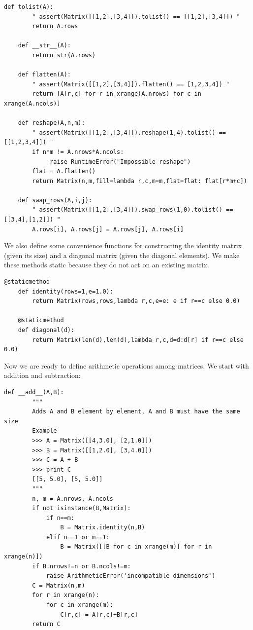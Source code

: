 \documentclass[justified,sixbynine]{tufte-book}
\def\ft{\small\tt}
\theoremstyle{plain}%
\theoremstyle{definition}
\theoremstyle{remark}
\begin{document}
\begin{fullwidth}
\begin{lstlisting}[caption={in file: {\ft nlib.py}}]
    def tolist(A):
        " assert(Matrix([[1,2],[3,4]]).tolist() == [[1,2],[3,4]]) "
        return A.rows

    def __str__(A):
        return str(A.rows)

    def flatten(A):
        " assert(Matrix([[1,2],[3,4]]).flatten() == [1,2,3,4]) "
        return [A[r,c] for r in xrange(A.nrows) for c in xrange(A.ncols)]

    def reshape(A,n,m):
        " assert(Matrix([[1,2],[3,4]]).reshape(1,4).tolist() == [[1,2,3,4]]) "
        if n*m != A.nrows*A.ncols:
             raise RuntimeError("Impossible reshape")
        flat = A.flatten()
        return Matrix(n,m,fill=lambda r,c,m=m,flat=flat: flat[r*m+c])

    def swap_rows(A,i,j):
        " assert(Matrix([[1,2],[3,4]]).swap_rows(1,0).tolist() == [[3,4],[1,2]]) "
        A.rows[i], A.rows[j] = A.rows[j], A.rows[i]
\end{lstlisting}


We also define some convenience functions for constructing the identity matrix (given its size) and a diagonal matrix (given the diagonal elements). We make these methods static because they do not act on an existing matrix.

\begin{lstlisting}[caption={in file: {\ft nlib.py}}]
    @staticmethod
    def identity(rows=1,e=1.0):
        return Matrix(rows,rows,lambda r,c,e=e: e if r==c else 0.0)

    @staticmethod
    def diagonal(d):
        return Matrix(len(d),len(d),lambda r,c,d=d:d[r] if r==c else 0.0)
\end{lstlisting}

Now we are ready to define arithmetic operations among matrices. We start with addition and subtraction:


\begin{lstlisting}[caption={in file: {\ft nlib.py}}]
    def __add__(A,B):
        """
        Adds A and B element by element, A and B must have the same size
        Example
        >>> A = Matrix([[4,3.0], [2,1.0]])
        >>> B = Matrix([[1,2.0], [3,4.0]])
        >>> C = A + B
        >>> print C
        [[5, 5.0], [5, 5.0]]
        """
        n, m = A.nrows, A.ncols
        if not isinstance(B,Matrix):
            if n==m:
                B = Matrix.identity(n,B)
            elif n==1 or m==1:
                B = Matrix([[B for c in xrange(m)] for r in xrange(n)])
        if B.nrows!=n or B.ncols!=m:
            raise ArithmeticError('incompatible dimensions')
        C = Matrix(n,m)
        for r in xrange(n):
            for c in xrange(m):
                C[r,c] = A[r,c]+B[r,c]
        return C


\end{lstlisting}
\end{fullwidth}
\end{document}
